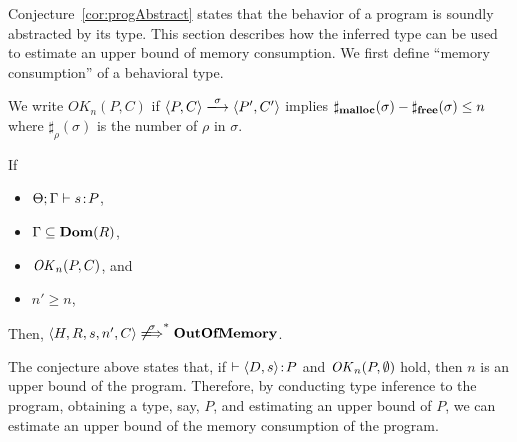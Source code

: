 Conjecture~\ref{cor:progAbstract} states that the behavior of a program
is soundly abstracted by its type.  This section describes how the
inferred type can be used to estimate an upper bound of memory
consumption.  We first define ``memory consumption'' of a behavioral
type.

\begin{myDef}
\label{df:okn} We write \(OK_n(P, C)\) if \(\langle P, C \rangle
\xlongrightarrow{\sigma} \langle P', C'\rangle \) implies
\(\sharp_{\mathbf{malloc}}(\sigma) - \sharp_{\mathbf{free}}(\sigma) \le n\) where
$\sharp_\rho(\sigma)$ is the number of $\rho$ in $\sigma$.
\end{myDef}

\begin{conjecture}
\label{lem:immediateSafety}
If
 \begin{itemize}
  \item $\Theta;\Gamma \vdash s \!:\! P$,
  \item $\Gamma \subseteq \mathbf{Dom}(R)$,
  \item $\mathit{OK}_n(P,C)$, and
  \item $n' \ge n$,
 \end{itemize}
 Then, \(\langle H, R, s, n', C \rangle \not\xLongrightarrow{\sigma}^* \OVERFLOW \).
\end{conjecture}

The conjecture above states that, if $\vdash \langle D, s \rangle \!:\!
P$ and $\mathit{OK}_n(P,\emptyset)$ hold, then $n$ is an upper bound of the
program.  Therefore, by conducting type inference to the program,
obtaining a type, say, $P$, and estimating an upper bound of $P$, we can
estimate an upper bound of the memory consumption of the program.









